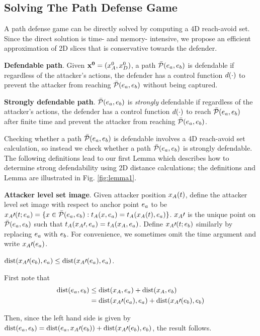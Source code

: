 \subsection{Solving The Path Defense Game}
A path defense game can be directly solved by computing a 4D reach-avoid set. Since the direct solution is time- and memory- intensive, we propose an efficient approximation of 2D slices that is conservative towards the defender.

\begin{defn} %
\textbf{Defendable path}. Given $\mathbf{x^0}=(x_A^0,x_D^0)$, a path $\bar{\mathcal{P}}(e_a,e_b)$ is defendable if regardless of the attacker's actions, the defender has a control function $d(\cdot)$ to prevent the attacker from reaching $\bar{\mathcal{P}}(e_a,e_b)$ without being captured.
\end{defn}

\begin{defn} %
\textbf{Strongly defendable path}. $\bar{\mathcal{P}}(e_a,e_b)$ is \textit{strongly} defendable if regardless of the attacker's actions, the defender has a control function $d(\cdot)$ to reach $\bar{\mathcal{P}}(e_a,e_b)$ after finite time and prevent the attacker from reaching $\bar{\mathcal{P}}(e_a,e_b)$.
\end{defn}

Checking whether a path $\bar{\mathcal{P}}(e_a,e_b)$ is defendable involves a 4D reach-avoid set calculation, so instead we check whether a path $\bar{\mathcal{P}}(e_a,e_b)$ is strongly defendable. The following definitions lead to our first Lemma which describes how to determine strong defendability using 2D distance calculations; the definitions and Lemma are illustrated in Fig. \ref{fig:lemma1}.

\begin{defn} %
\textbf{Attacker level set image}. Given attacker position $x_A(t)$, define the attacker level set image with respect to anchor point $e_a$ to be $x_A\prime(t;e_a) = \{x\in\bar{\mathcal{P}}(e_a,e_b): t_A(x,e_a) = t_A(x_A(t),e_a)\}$. $x_A\prime$ is the unique point on $\bar{\mathcal{P}}(e_a,e_b)$ such that $t_A(x_A\prime, e_a)=t_A(x_A,e_a)$. Define $x_A\prime(t;e_b)$ similarly by replacing $e_a$ with $e_b$. For convenience, we sometimes omit the time argument and write $x_A\prime(e_a)$.
\end{defn}

\begin{prop}
\label{rem:image_of_a}
$\text{dist}(x_A\prime(e_b),e_a) \le \text{dist}(x_A\prime(e_a),e_a)$. 
\end{prop}

\begin{IEEEproof}
First note that
\begin{equation*}
\begin{aligned}
\text{dist}(e_a,e_b) &\le \text{dist}(x_A,e_a) + \text{dist}(x_A,e_b)\\
& = \text{dist}(x_A\prime(e_a),e_a) + \text{dist}(x_A\prime(e_b),e_b)
\end{aligned}
\end{equation*}

Then, since the left hand side is given by $\text{dist}(e_a,e_b) = \text{dist}(e_a,x_A\prime(e_b))+\text{dist}(x_A\prime(e_b),e_b)$, the result follows.
\end{IEEEproof}


